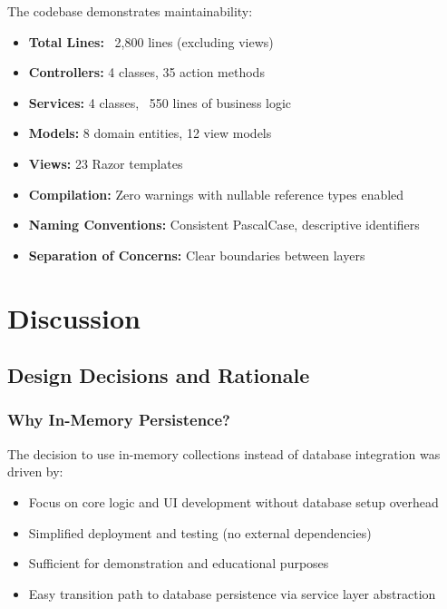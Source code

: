 \documentclass[12pt,a4paper]{article}
\begin{document}
The codebase demonstrates maintainability:

\begin{itemize}[leftmargin=*]
    \item \textbf{Total Lines:} ~2,800 lines (excluding views)
    \item \textbf{Controllers:} 4 classes, 35 action methods
    \item \textbf{Services:} 4 classes, ~550 lines of business logic
    \item \textbf{Models:} 8 domain entities, 12 view models
    \item \textbf{Views:} 23 Razor templates
    \item \textbf{Compilation:} Zero warnings with nullable reference types enabled
    \item \textbf{Naming Conventions:} Consistent PascalCase, descriptive identifiers
    \item \textbf{Separation of Concerns:} Clear boundaries between layers
\end{itemize}

\newpage
\section{Discussion}

\subsection{Design Decisions and Rationale}

\subsubsection{Why In-Memory Persistence?}

The decision to use in-memory collections instead of database integration was driven by:

\begin{itemize}[leftmargin=*]
    \item Focus on core logic and UI development without database setup overhead
    \item Simplified deployment and testing (no external dependencies)
    \item Sufficient for demonstration and educational purposes
    \item Easy transition path to database persistence via service layer abstraction
\end{itemize}
\end{document}
